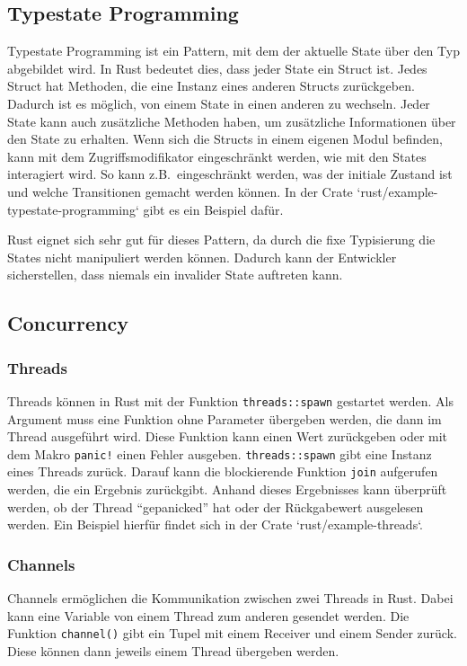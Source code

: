 \documentclass[letterpaper,12pt]{article}
\begin{document}
    \subsection{Typestate Programming}\label{subsec:typestate-programming)}
    Typestate Programming ist ein Pattern, mit dem der aktuelle State über den Typ abgebildet wird.
    In Rust bedeutet dies, dass jeder State ein Struct ist.
    Jedes Struct hat Methoden, die eine Instanz eines anderen Structs zurückgeben.
    Dadurch ist es möglich, von einem State in einen anderen zu wechseln.
    Jeder State kann auch zusätzliche Methoden haben, um zusätzliche Informationen über den State zu erhalten.
    Wenn sich die Structs in einem eigenen Modul befinden, kann mit dem Zugriffsmodifikator eingeschränkt werden, wie mit den States interagiert wird.
    So kann z.B.\ eingeschränkt werden, was der initiale Zustand ist und welche Transitionen gemacht werden können.
    In der Crate `rust/example-typestate-programming` gibt es ein Beispiel dafür.

    Rust eignet sich sehr gut für dieses Pattern, da durch die fixe Typisierung die States nicht manipuliert werden können.
    Dadurch kann der Entwickler sicherstellen, dass niemals ein invalider State auftreten kann.

    \subsection{Concurrency}\label{subsec:concurrency}
    \subsubsection{Threads}\label{subsubsec:threads}
    Threads können in Rust mit der Funktion \texttt{threads::spawn} gestartet werden.
    Als Argument muss eine Funktion ohne Parameter übergeben werden, die dann im Thread ausgeführt wird.
    Diese Funktion kann einen Wert zurückgeben oder mit dem Makro \texttt{panic!} einen Fehler ausgeben.
        \texttt{threads::spawn} gibt eine Instanz eines Threads zurück.
    Darauf kann die blockierende Funktion \texttt{join} aufgerufen werden, die ein Ergebnis zurückgibt.
    Anhand dieses Ergebnisses kann überprüft werden, ob der Thread \enquote{gepanicked} hat oder der Rückgabewert ausgelesen werden.
    Ein Beispiel hierfür findet sich in der Crate `rust/example-threads`.

    \subsubsection{Channels}\label{subsubsec:channels}
    Channels ermöglichen die Kommunikation zwischen zwei Threads in Rust.
    Dabei kann eine Variable von einem Thread zum anderen gesendet werden.
    Die Funktion \texttt{channel()} gibt ein Tupel mit einem Receiver und einem Sender zurück.
    Diese können dann jeweils einem Thread übergeben werden.
\end{document}
